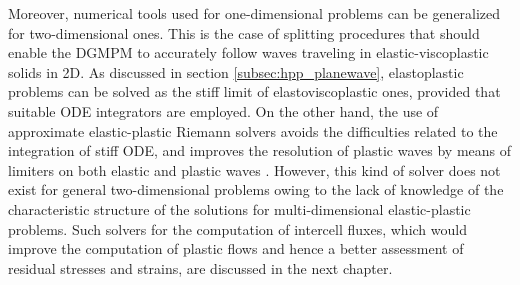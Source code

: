 Moreover, numerical tools used for one-dimensional problems can be generalized for two-dimensional ones. 
This is the case of splitting procedures that should enable the DGMPM to accurately follow waves traveling in elastic-viscoplastic solids in 2D. 
As discussed in section \ref{subsec:hpp_planewave}, elastoplastic problems can be solved as the stiff limit of elastoviscoplastic ones, provided that suitable ODE integrators are employed. %
On the other hand, the use of approximate elastic-plastic Riemann solvers avoids the difficulties related to the integration of stiff ODE, and improves the resolution of plastic waves by means of limiters on both elastic and plastic waves \cite{Thomas_EP}.
However, this kind of solver does not exist for general two-dimensional problems owing to the lack of knowledge of the characteristic structure of the solutions for multi-dimensional elastic-plastic problems. 
Such solvers for the computation of intercell fluxes, which would improve the computation of plastic flows and hence a better assessment of residual stresses and strains, are discussed in the next chapter. 

